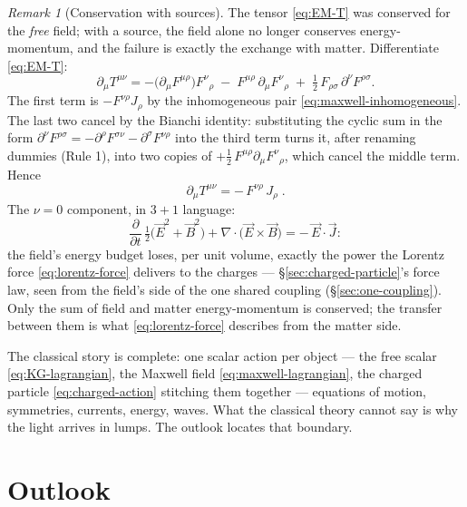 \documentclass[11pt]{article}
\theoremstyle{plain}
\theoremstyle{definition}
\theoremstyle{remark}
\newtheorem{remark}[theorem]{Remark}
\newcommand{\pd}[2]{\frac{\partial #1}{\partial #2}}
\newcommand{\vE}{\vec{E}}
\newcommand{\vB}{\vec{B}}
\begin{document}
\begin{remark}[Conservation with sources]\label{rem:T-with-sources}
The tensor \eqref{eq:EM-T} was conserved for the \emph{free} field;
with a source, the field alone no longer conserves energy-momentum, and
the failure is exactly the exchange with matter. Differentiate
\eqref{eq:EM-T}:
\begin{equation}
  \partial_\mu T^{\mu\nu}
  = -\bigl(\partial_\mu F^{\mu\rho}\bigr)F^{\nu}{}_{\rho}
    \;-\; F^{\mu\rho}\,\partial_\mu F^{\nu}{}_{\rho}
    \;+\; \tfrac12\,F_{\rho\sigma}\,\partial^\nu F^{\rho\sigma} .
\end{equation}
The first term is $-F^{\nu\rho}J_\rho$ by the inhomogeneous pair
\eqref{eq:maxwell-inhomogeneous}. The last two cancel by the Bianchi
identity: substituting the cyclic sum in the form
$\partial^\nu F^{\rho\sigma} = -\partial^\rho F^{\sigma\nu}
- \partial^\sigma F^{\nu\rho}$ into the third term turns it, after
renaming dummies (Rule 1), into two copies of
$+\tfrac12\,F^{\mu\rho}\partial_\mu F^{\nu}{}_{\rho}$, which cancel the
middle term. Hence
\begin{equation}
  \boxed{\;
  \partial_\mu T^{\mu\nu} = -\,F^{\nu\rho}\,J_\rho\; .
  \;}
\end{equation}
The $\nu = 0$ component, in $3{+}1$ language:
\begin{equation}
  \pd{}{t}\,\tfrac12\bigl(\vE^2 + \vB^2\bigr)
  + \nabla\cdot\bigl(\vE\times\vB\bigr)
  = -\,\vE\cdot\vec J :
\end{equation}
the field's energy budget loses, per unit volume, exactly the power the
Lorentz force \eqref{eq:lorentz-force} delivers to the charges ---
\S\ref{sec:charged-particle}'s force law, seen from the field's side of
the one shared coupling (\S\ref{sec:one-coupling}). Only the sum of
field and matter energy-momentum is conserved; the transfer between
them is what \eqref{eq:lorentz-force} describes from the matter side.
\end{remark}

\medskip
\noindent
The classical story is complete: one scalar action per object --- the
free scalar \eqref{eq:KG-lagrangian}, the Maxwell field
\eqref{eq:maxwell-lagrangian}, the charged particle
\eqref{eq:charged-action} stitching them together --- equations of
motion, symmetries, currents, energy, waves. What the classical
theory cannot say is why the light arrives in lumps. The outlook
locates that boundary.


\section{Outlook}
\label{sec:outlook}
\end{document}
